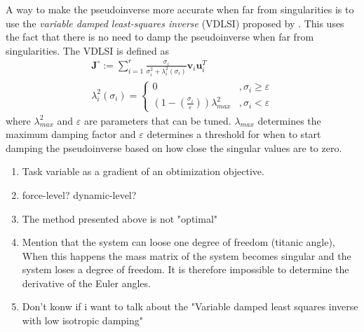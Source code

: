 A way to make the pseudoinverse more accurate when far from singularities is to
use the \emph{variable damped least-squares inverse} (VDLSI) proposed by \cite{chiaverini1997}.
This uses the fact that there is no need to damp the pseudoinverse when far from singularities.
The VDLSI is defined as
\begin{subequations}
\begin{align}
    \bm{J}^{\circ} := \sum_{i=1}^r \frac{\sigma_i}{\sigma_i^2 + \lambda_i^2(\sigma_i)} \bm{v}_i \bm{u}_i^T \\
    \lambda_i^2(\sigma_i) = \begin{cases}
        0 & ,\sigma_i \geq \varepsilon \\
        \left(1-\left(\frac{\sigma_i}{\varepsilon}\right)\right)\lambda_{max}^2 & ,\sigma_i < \varepsilon
    \end{cases}
\end{align}
\end{subequations}
where $\lambda_{max}^2$ and $\varepsilon$ are parameters that can be tuned. $\lambda_{max}$
determines the maximum damping factor and $\varepsilon$ determines a threshold for when
to start damping the pseudoinverse based on how close the singular values are to zero.

{
\color{red}
}
{
    \color{red}
    \begin{enumerate}
        \item Task variable as a gradient of an obtimization objective.
        \item force-level? dynamic-level?
        \item The method presented above is not "optimal"
        \item Mention that the system can loose one degree of freedom (titanic angle), When this happens the mass matrix of the system becomes singular
and the system loses a degree of freedom. It is therefore impossible to determine
the derivative of the Euler angles.
        \item Don't konw if i want to talk about the "Variable damped least squares inverse with low isotropic damping"
    \end{enumerate}
}

